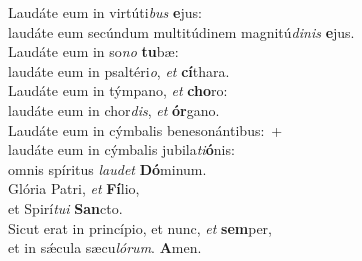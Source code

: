 \evenverse Laudáte eum in virtúti\textit{bus} \textbf{e}jus:~\*\\
\evenverse laudáte eum secúndum multitúdinem magnitú\textit{di}\textit{nis} \textbf{e}jus.\\
\oddverse Laudáte eum in so\textit{no} \textbf{tu}bæ:~\*\\
\oddverse laudáte eum in psaltéri\textit{o}, \textit{et} \textbf{cí}thara.\\
\evenverse Laudáte eum in týmpano, \textit{et} \textbf{cho}ro:~\*\\
\evenverse laudáte eum in chor\textit{dis}, \textit{et} \textbf{ór}gano.\\
\oddverse Laudáte eum in cýmbalis benesonántibus:~+\\
\oddverse  laudáte eum in cýmbalis jubila\textit{ti}\textbf{ó}nis:~\*\\
\oddverse omnis spíritus \textit{lau}\textit{det} \textbf{Dó}minum.\\
\evenverse Glória Patri, \textit{et} \textbf{Fí}lio,~\*\\
\evenverse et Spirí\textit{tu}\textit{i} \textbf{San}cto.\\
\oddverse Sicut erat in princípio, et nunc, \textit{et} \textbf{sem}per,~\*\\
\oddverse et in sǽcula sæcu\textit{ló}\textit{rum}. \textbf{A}men.\\

